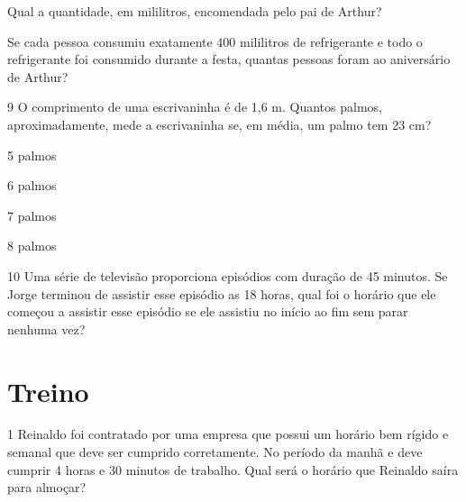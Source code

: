 \begin{escolha}
\item
  Qual a quantidade, em mililitros, encomendada pelo pai de Arthur?


\item
  Se cada pessoa consumiu exatamente 400 mililitros de refrigerante e
  todo o refrigerante foi consumido durante a festa, quantas pessoas
  foram ao aniversário de Arthur?

\end{escolha}


\num{9} O comprimento de uma escrivaninha é de 1,6 m. Quantos palmos,
aproximadamente, mede a escrivaninha se, em média, um palmo tem 23 cm?

\begin{escolha}
\item
  5 palmos
\item
  6 palmos
\item
  7 palmos
\item
  8 palmos
\end{escolha}


\num{10} Uma série de televisão proporciona episódios com duração de 45
minutos. Se Jorge terminou de assistir esse episódio as 18 horas, qual
foi o horário que ele começou a assistir esse episódio se ele assistiu
no início ao fim sem parar nenhuma vez?



\section{Treino}

\num{1} Reinaldo foi contratado por uma empresa que possui um horário bem
rígido e semanal que deve ser cumprido corretamente. No período da manhã
e deve cumprir 4 horas e 30 minutos de trabalho. Qual será o horário que
Reinaldo saíra para almoçar?

